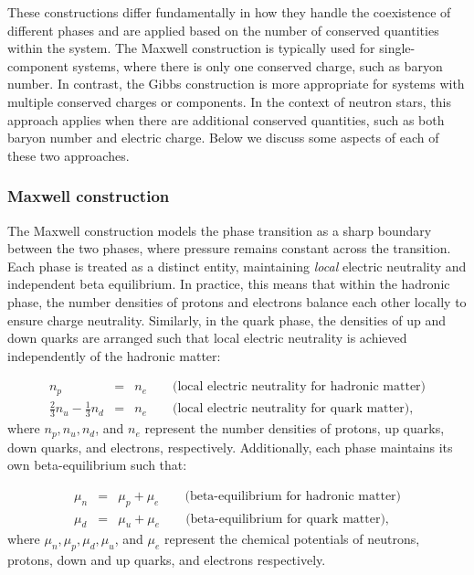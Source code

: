 \documentclass[main.tex]{subfiles}
\begin{document}
    These constructions differ fundamentally in how they handle the coexistence of different phases and are applied based on the number of conserved quantities within the system. The Maxwell construction is typically used for single-component systems, where there is only one conserved charge, such as baryon number. In contrast, the Gibbs construction is more appropriate for systems with multiple conserved charges or components. In the context of neutron stars, this approach applies when there are additional conserved quantities, such as both baryon number and electric charge. Below we discuss some aspects of each of these two approaches.
    
    \subsubsection{Maxwell construction}
    The Maxwell construction models the phase transition as a sharp boundary between the two phases, where pressure remains constant across the transition. Each phase is treated as a distinct entity, maintaining \textit{local} electric neutrality and independent beta equilibrium. In practice, this means that within the hadronic phase, the number densities of protons and electrons balance each other locally to ensure charge neutrality. Similarly, in the quark phase, the densities of up and down quarks are arranged such that local electric neutrality is achieved independently of the hadronic matter:

    \begin{eqnarray}
        n_p &=& n_e\qquad \textrm{(local electric neutrality for hadronic matter)} \\
        \frac{2}{3}n_u - \frac{1}{3}n_d &=& n_e\qquad \textrm{(local electric neutrality for quark matter)},
    \end{eqnarray}
    where $n_p, n_u, n_d$, and $n_e$ represent the number densities of protons, up quarks, down quarks, and electrons, respectively. Additionally, each phase maintains its own beta-equilibrium such that:

    \begin{eqnarray}
        \mu_n &=& \mu_p + \mu_e\qquad \textrm{(beta-equilibrium for hadronic matter)} \\
        \mu_d &=& \mu_u + \mu_e\qquad \textrm{(beta-equilibrium for quark matter)},
    \end{eqnarray}
    where $\mu_n, \mu_p, \mu_d, \mu_u$, and $\mu_e$ represent the chemical potentials of neutrons, protons, down and up quarks, and electrons respectively.
\end{document}
